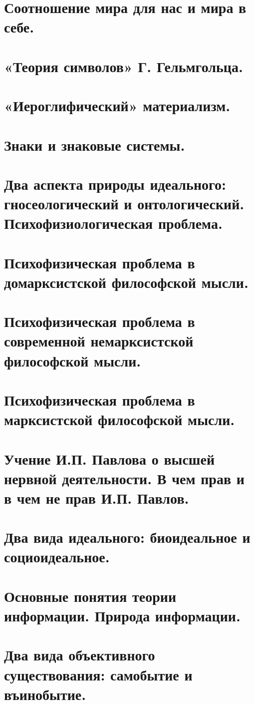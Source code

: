 \section{ Соотношение мира для нас и мира в себе.}
\section{ «Теория символов» Г. Гельмгольца.}
\section{ «Иероглифический» материализм.}
\section{ Знаки и знаковые системы.}
\section{ Два аспекта природы идеального: гносеологический и онтологический. Психофизиологическая проблема.}
\section{ Психофизическая проблема в домарксистской философской мысли.}
\section{ Психофизическая проблема в современной немарксистской философской мысли.}
\section{ Психофизическая проблема в марксистской философской мысли.}
\section{ Учение И.П. Павлова о высшей нервной деятельности. В чем прав и в чем не прав И.П. Павлов.}
\section{ Два вида идеального: биоидеальное и социоидеальное.}
\section{ Основные понятия теории информации. Природа информации.}
\section{ Два вида объективного существования: самобытие и въинобытие.}
